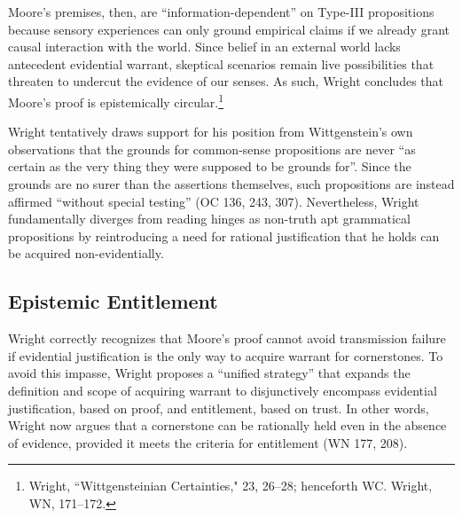 Moore's premises, then, are ``information-dependent'' on Type-III
propositions because sensory experiences can only ground empirical
claims if we already grant causal interaction with the world. Since
belief in an external world lacks antecedent evidential warrant,
skeptical scenarios remain live possibilities that threaten to undercut
the evidence of our senses. As such, Wright concludes that Moore's proof
is epistemically circular.\footnote{Wright, ``Wittgensteinian
  Certainties," 23, 26--28; henceforth WC. Wright, WN, 171--172.}

Wright tentatively draws support for his position from Wittgenstein's
own observations that the grounds for common-sense propositions are
never ``as certain as the very thing they were supposed to be grounds
for''. Since the grounds are no surer than the assertions themselves,
such propositions are instead affirmed ``without special testing'' (OC
136, 243, 307). Nevertheless, Wright fundamentally diverges from reading
hinges as non-truth apt grammatical propositions by reintroducing a need
for rational justification that he holds can be acquired
non-evidentially.

\subsection{Epistemic Entitlement}

Wright correctly recognizes that Moore's proof cannot avoid transmission
failure if evidential justification is the only way to acquire warrant
for cornerstones. To avoid this impasse, Wright proposes a ``unified
strategy'' that expands the definition and scope of acquiring warrant to
disjunctively encompass evidential justification, based on proof, and
entitlement, based on trust. In other words, Wright now argues that a
cornerstone can be rationally held even in the absence of evidence,
provided it meets the criteria for entitlement (WN 177, 208).

